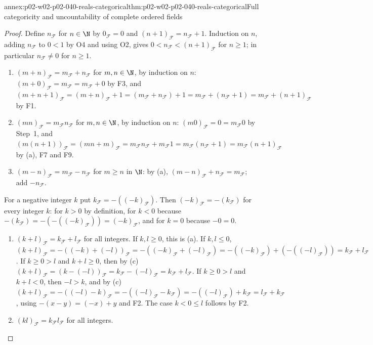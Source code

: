 \begin{annexitem}{annex:p02-w02-p02-040-reals-categorical}{thm:p02-w02-p02-040-reals-categorical}{Full categoricity and uncountability of complete ordered fields}
\begin{proof}
Define \(n_{\mathcal F}\) for \(n\in\N\) by \(0_{\mathcal F}=0\) and
\((n+1)_{\mathcal F}=n_{\mathcal F}+1\).  Induction on \(n\), adding
\(n_{\mathcal F}\) to \(0<1\) by O4 and using O2, gives
\(0<n_{\mathcal F}<(n+1)_{\mathcal F}\) for \(n\geq1\); in particular
\(n_{\mathcal F}\neq0\) for \(n\ge1\).
\begin{enumerate}
 \item[(a)] \((m+n)_{\mathcal F}=m_{\mathcal F}+n_{\mathcal F}\) for
   \(m,n\in\N\), by induction on \(n\): \((m+0)_{\mathcal F}=m_{\mathcal F}=m_{\mathcal F}+0\)
   by F3, and \((m+n+1)_{\mathcal F}=(m+n)_{\mathcal F}+1=(m_{\mathcal F}+n_{\mathcal F})+1
   =m_{\mathcal F}+(n_{\mathcal F}+1)=m_{\mathcal F}+(n+1)_{\mathcal F}\) by F1.
 \item[(b)] \((mn)_{\mathcal F}=m_{\mathcal F}n_{\mathcal F}\) for \(m,n\in\N\),
   by induction on \(n\): \((m0)_{\mathcal F}=0=m_{\mathcal F}0\) by Step~1,
   and \((m(n+1))_{\mathcal F}=(mn+m)_{\mathcal F}=m_{\mathcal F}n_{\mathcal F}+m_{\mathcal F}1
   =m_{\mathcal F}(n_{\mathcal F}+1)=m_{\mathcal F}(n+1)_{\mathcal F}\) by (a), F7 and F9.
 \item[(c)] \((m-n)_{\mathcal F}=m_{\mathcal F}-n_{\mathcal F}\) for
   \(m\ge n\) in \(\N\): by (a), \((m-n)_{\mathcal F}+n_{\mathcal F}=m_{\mathcal F}\);
   add \(-n_{\mathcal F}\).
\end{enumerate}
For a negative integer \(k\) put \(k_{\mathcal F}=-((-k)_{\mathcal F})\).
Then \((-k)_{\mathcal F}=-(k_{\mathcal F})\) for every integer \(k\): for
\(k>0\) by definition, for \(k<0\) because
\(-(k_{\mathcal F})=-(-((-k)_{\mathcal F}))=(-k)_{\mathcal F}\), and for \(k=0\)
because \(-0=0\).
\begin{enumerate}
 \item[(d)] \((k+l)_{\mathcal F}=k_{\mathcal F}+l_{\mathcal F}\) for all integers.
   If \(k,l\ge0\), this is (a).  If \(k,l\le0\),
   \((k+l)_{\mathcal F}=-((-k)+(-l))_{\mathcal F}=-((-k)_{\mathcal F}+(-l)_{\mathcal F})
   =-((-k)_{\mathcal F})+(-((-l)_{\mathcal F}))=k_{\mathcal F}+l_{\mathcal F}\).
   If \(k\ge0>l\) and \(k+l\ge0\), then by (c)
   \((k+l)_{\mathcal F}=(k-(-l))_{\mathcal F}=k_{\mathcal F}-(-l)_{\mathcal F}=k_{\mathcal F}+l_{\mathcal F}\).
   If \(k\ge0>l\) and \(k+l<0\), then \(-l>k\), and by (c)
   \((k+l)_{\mathcal F}=-((-l)-k)_{\mathcal F}=-((-l)_{\mathcal F}-k_{\mathcal F})
   =-((-l)_{\mathcal F})+k_{\mathcal F}=l_{\mathcal F}+k_{\mathcal F}\), using
   \(-(x-y)=(-x)+y\) and F2.  The case \(k<0\le l\) follows by F2.
 \item[(e)] \((kl)_{\mathcal F}=k_{\mathcal F}l_{\mathcal F}\) for all integers.

\end{enumerate}
\end{proof}
\end{annexitem}
